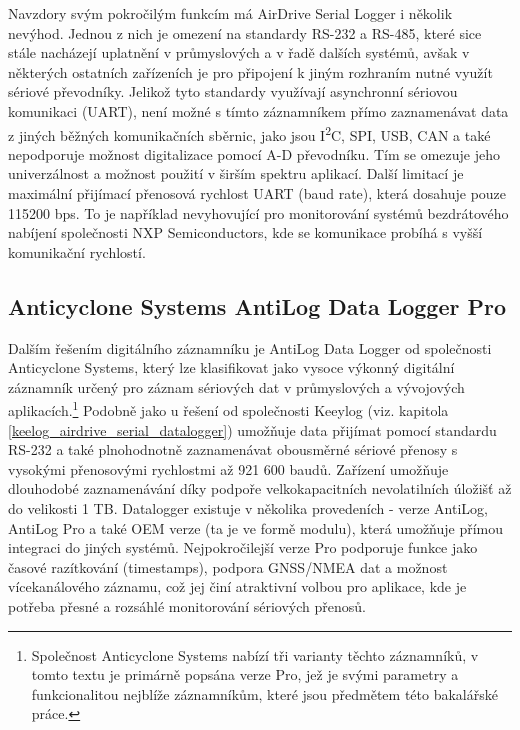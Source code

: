 Navzdory svým pokročilým funkcím má AirDrive Serial Logger i několik nevýhod. Jednou z nich je omezení na standardy RS-232 a RS-485, které sice stále nacházejí uplatnění v průmyslových a v řadě dalších systémů, avšak v některých ostatních zařízeních je pro připojení k jiným rozhraním nutné využít sériové převodníky. Jelikož tyto standardy využívají asynchronní sériovou komunikaci (UART), není možné s tímto záznamníkem přímo zaznamenávat data z jiných běžných komunikačních sběrnic, jako jsou I\textsuperscript{2}C, SPI, USB, CAN a také nepodporuje možnost digitalizace pomocí A-D převodníku. Tím se omezuje jeho univerzálnost a možnost použití v širším spektru aplikací. Další limitací je maximální přijímací přenosová rychlost UART (baud rate), která dosahuje pouze 115200 bps. To je například nevyhovující pro monitorování systémů bezdrátového nabíjení společnosti NXP Semiconductors, kde se komunikace probíhá s vyšší komunikační rychlostí. \cite{keelog_airdrive_serial_datalogger}

\subsection{Anticyclone Systems AntiLog Data Logger Pro}
\label{anticyclone_systems_antilog_data_logger}
Dalším řešením digitálního záznamníku je AntiLog Data Logger od společnosti Anticyclone Systems, který lze klasifikovat jako vysoce výkonný digitální záznamník určený pro záznam sériových dat v průmyslových a vývojových aplikacích.\footnote{Společnost Anticyclone Systems nabízí tři varianty těchto záznamníků, v tomto textu je primárně popsána verze Pro, jež je svými parametry a funkcionalitou nejblíže záznamníkům, které jsou předmětem této bakalářské práce.} Podobně jako u řešení od společnosti Keeylog (viz. kapitola \ref{keelog_airdrive_serial_datalogger}) umožňuje data přijímat pomocí standardu RS-232 a také plnohodnotně zaznamenávat obousměrné sériové přenosy s vysokými přenosovými rychlostmi až 921 600 baudů. Zařízení umožňuje dlouhodobé zaznamenávání díky podpoře velkokapacitních nevolatilních úložišť až do velikosti 1 TB. Datalogger existuje v několika provedeních - verze AntiLog, AntiLog Pro a také OEM verze (ta je ve formě modulu), která umožňuje přímou integraci do jiných systémů. Nejpokročilejší verze Pro podporuje funkce jako časové razítkování (timestamps), podpora GNSS/NMEA dat a možnost vícekanálového záznamu, což jej činí atraktivní volbou pro aplikace, kde je potřeba přesné a rozsáhlé monitorování sériových přenosů. \cite{anticyclone_systems_antilog_pro}

